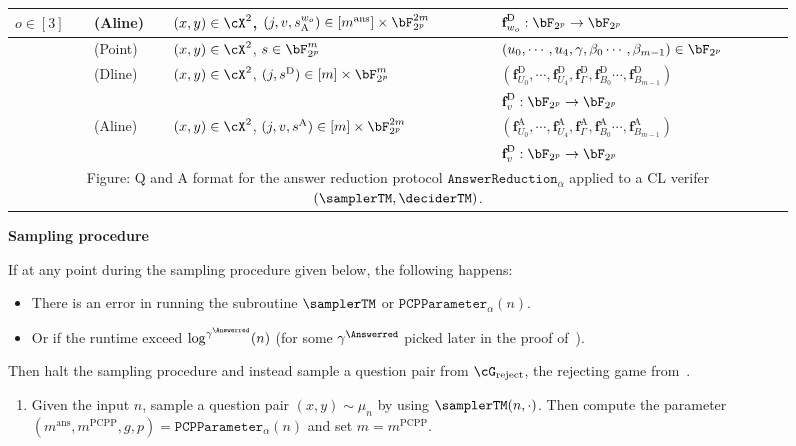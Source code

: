 \begin{figure}[!htbp]
\begin{gamespec}
\begin{tabularx}{\textwidth}{ l   l  l   X   }
			 \quad $o \in [3]$ & (Aline)   &  $(x,y) \in \cX^2$,  $(j,v, s_{\text{A}}^{w_o}) \in [m^{\text{ans}}] \times \bF_{2^p}^{2m}$ & $\textbf{f}_{w_o}^{\text{D}}: \bF_{2^p} \rightarrow \bF_{2^p}$\\
			 \hline 
			 \rule{0pt}{3ex}   
			  \multirow{5}{*}{(\text{Ora})}& (Point) & $(x,y) \in \cX^2$,  $s \in \bF_{2^p}^{m}$ & $(u_0, \cdots, u_4, \gamma, \beta_0 \cdots, \beta_{m-1}) \in \bF_{2^p}$\\
			& (Dline) &   $(x,y) \in \cX^2$,  $(j, s^{\text{D}}) \in [m] \times \bF_{2^p}^{m}$ & $(\textbf{f}_{U_0}^{\text{D}}, \cdots, \textbf{f}_{U_4}^{\text{D}}, \textbf{f}_{\Gamma}^{\text{D}}, \textbf{f}_{B_0}^{\text{D}} \cdots,\textbf{f}_{B_{m-1}}^{\text{D}} ) $\\
			&  &   & ${\textbf{f}_{v}^{\text{D}}:\bF_{2^p} \rightarrow \bF_{2^p}}$\\
			 & (Aline)  &  $(x,y) \in \cX^2$,  $(j,v, s^{\text{A}}) \in [m] \times \bF_{2^p}^{2m}$ & $(\textbf{f}_{U_0}^{\text{A}}, \cdots, \textbf{f}_{U_4}^{\text{A}}, \textbf{f}_{\Gamma}^{\text{A}}, \textbf{f}_{B_0}^{\text{A}} \cdots,\textbf{f}_{B_{m-1}}^{\text{A}} )$ \\
			 &  &   & ${\textbf{f}_{v}^{\text{D}}:\bF_{2^p} \rightarrow \bF_{2^p}}$\\
			\bottomrule
			\multicolumn{4}{c}{Figure: Q and A format for the answer reduction protocol $\texttt{AnswerReduction}_{\alpha}$ applied to a CL verifer $(\samplerTM, \deciderTM)$. }
		\end{tabularx}
		\footnotesize
		\begin{center}
			\textbf{Sampling procedure}
		\end{center}
		If at any point during the sampling procedure given below, the following happens:
		\begin{itemize}
			\item There is an error in running the subroutine $\samplerTM$ or $\mathtt{PCPParameter}_{\alpha}(n)$. 
			\item Or if the runtime exceed $\log^{\gamma^{\Answerred}}(n)$ (for some $\gamma^{\Answerred}$ picked later in the proof of~). 
		\end{itemize}
		Then halt the sampling procedure and instead sample a question pair from $\cG_{\text{reject}}$, the rejecting game from~. 
		\begin{enumerate}
			\item Given the input $n$, sample a question pair $(x,y) \sim \mu_n$ by using $\samplerTM(n, \cdot)$. Then compute the parameter $(m^{\text{ans}}, m^{\text{PCPP}}, g,p) = \mathtt{PCPParameter}_{\alpha}(n)$ and set $m = m^{\text{PCPP}}$. 

\end{enumerate}
\end{gamespec}
\end{figure}

